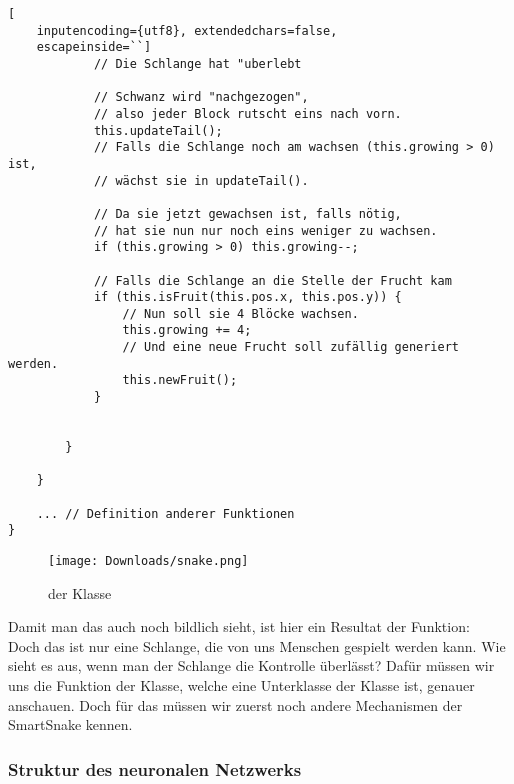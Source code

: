 \documentclass[10pt,a4paper,ngerman,english]{article}
\begin{document}
\begin{lstlisting}[
    inputencoding={utf8}, extendedchars=false,  
    escapeinside=``]
            // Die Schlange hat "uberlebt

            // Schwanz wird "nachgezogen", 
            // also jeder Block rutscht eins nach vorn.
            this.updateTail(); 
            // Falls die Schlange noch am wachsen (this.growing > 0) ist, 
            // wächst sie in updateTail().

            // Da sie jetzt gewachsen ist, falls nötig, 
            // hat sie nun nur noch eins weniger zu wachsen.
            if (this.growing > 0) this.growing--; 

            // Falls die Schlange an die Stelle der Frucht kam
            if (this.isFruit(this.pos.x, this.pos.y)) {
                // Nun soll sie 4 Blöcke wachsen.
                this.growing += 4; 
                // Und eine neue Frucht soll zufällig generiert werden.
                this.newFruit(); 
            }


        }

    }

    ... // Definition anderer Funktionen
}
\end{lstlisting}

\begin{wrapfigure}[10]{l}{0.4\textwidth} 
    \vspace{-20pt}
        \begin{center}
            \texttt{[image: Downloads/snake.png]}
            \caption{ der Klasse }
        \end{center}
    \vspace{-35pt}
\end{wrapfigure} 

Damit man das auch noch bildlich sieht, ist hier ein Resultat der  Funktion:\\

Doch das ist nur eine Schlange, die von uns Menschen gespielt werden kann. Wie sieht es aus, wenn man der Schlange die Kontrolle überlässt? Dafür müssen wir uns die  Funktion der  Klasse, welche eine Unterklasse der  Klasse ist, genauer anschauen. Doch für das müssen wir zuerst noch andere Mechanismen der SmartSnake kennen.


\vspace{6 em}
\subsubsection{Struktur des neuronalen Netzwerks}
\end{document}
